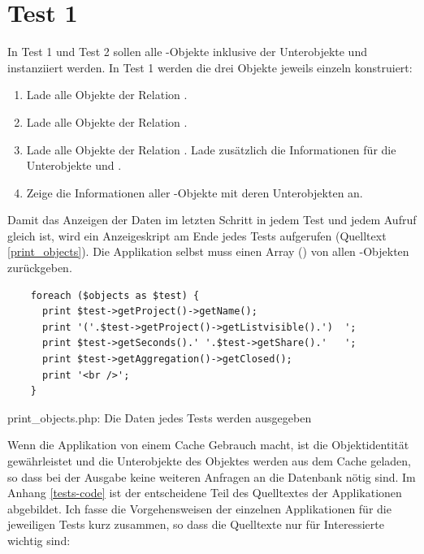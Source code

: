 \section{Test 1}
In Test 1 und Test 2 sollen alle -Objekte inklusive der Unterobjekte  und  instanziiert werden. In Test 1 werden die drei Objekte jeweils einzeln konstruiert:\\
\begin{enumerate}
\item Lade alle Objekte der Relation . \\
\item Lade alle Objekte der Relation . \\
\item Lade alle Objekte der Relation . Lade zusätzlich die Informationen für die Unterobjekte  und .
\item Zeige die Informationen aller -Objekte mit deren Unterobjekten an.
\end{enumerate}
Damit das Anzeigen der Daten im letzten Schritt in jedem Test und jedem Aufruf gleich ist, wird ein Anzeigeskript am Ende jedes Tests aufgerufen (Quelltext \ref{print_objects}). Die Applikation selbst muss einen Array () von allen -Objekten zurückgeben. \\
\begin{fcode}[bhtp]
    \lstset{style=php}
    \begin{lstlisting}
    foreach ($objects as $test) {
      print $test->getProject()->getName();
      print '('.$test->getProject()->getListvisible().')  ';
      print $test->getSeconds().' '.$test->getShare().'   ';
      print $test->getAggregation()->getClosed();
      print '<br />';
    }
    \end{lstlisting}
    \caption{print\_objects.php: Die Daten jedes Tests werden ausgegeben}
\label{print_objects}
\end{fcode}%
Wenn die Applikation von einem Cache Gebrauch macht, ist die Objektidentität gewährleistet und die Unterobjekte des Objektes  werden aus dem Cache geladen, so dass bei der Ausgabe keine weiteren Anfragen an die Datenbank nötig sind. Im Anhang \ref{tests-code} ist der entscheidene Teil des Quelltextes der Applikationen abgebildet. Ich fasse die Vorgehensweisen der einzelnen Applikationen für die jeweiligen Tests kurz zusammen, so dass die Quelltexte nur für Interessierte wichtig sind: 

